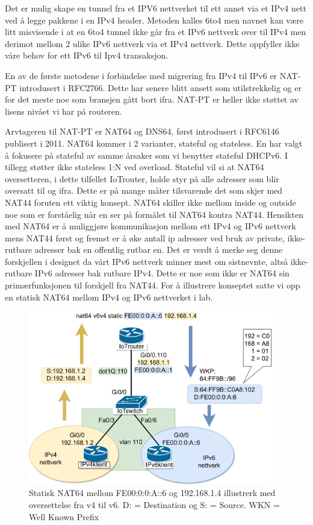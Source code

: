 \documentclass{article}
\begin{document}
Det er mulig skape en tunnel fra et IPV6 nettverket til ett annet via et IPv4 nett ved å legge pakkene i en IPv4 header. Metoden kalles 6to4\cite{rfc3056} men navnet kan være litt misvisende i at en 6to4 tunnel ikke går fra et IPv6 nettverk over til IPv4 men derimot mellom 2 ulike IPv6 nettverk via et IPv4 nettverk. Dette oppfyller ikke våre behov for ett IPv6 til Ipv4 transaksjon. 

En av de første metodene i forbindelse med migrering fra IPv4 til IPv6 er NAT-PT introdusert i RFC2766\cite{rfc2766}. Dette har senere blitt ansett som utilstrekkelig\cite{rfc4966} og er for det meste noe som bransjen gått bort ifra. NAT-PT er heller ikke støttet av lisens nivået vi har på routeren. 

Arvtageren til NAT-PT er NAT64 og DNS64, først introdusert i  RFC6146 publisert i 2011\cite{rfc6146}. NAT64 kommer i 2 varianter, stateful og stateless. En har valgt å fokusere på stateful av samme årsaker som vi benytter stateful DHCPv6. I tillegg støtter ikke stateless 1:N ved overload. Stateful vil si at NAT64 oversetteren, i dette tilfellet IoTrouter, holde styr på alle adresser som blir oversatt til og ifra. Dette er på mange måter tilsvarende det som skjer med NAT44 foruten ett viktig konsept. NAT64 skiller ikke mellom inside og outside noe som er forståelig når en ser på formålet til NAT64 kontra NAT44. Hensikten med NAT64 er å muliggjøre kommunikasjon mellom ett IPv4 og IPv6 nettverk mens NAT44 først og fremst er å øke antall ip adresser ved bruk av private, ikke-rutbare adresser bak en offentlig rutbar en. Det er verdt å merke seg denne forskjellen i designet da vårt IPv6 nettverk minner mest om sistnevnte, altså ikke-rutbare IPv6 adresser bak rutbare IPv4. Dette er noe som ikke er NAT64 sin primærfunksjonen til forskjell fra NAT44\cite{rfc1631}. For å illustrere konseptet satte vi opp en statisk NAT64 mellom IPv4 og IPv6 nettverket i lab.

\begin{figure} [!ht]
  \centering
      \includegraphics[width=0.95\textwidth]{statisknat64}
  \caption{Statisk NAT64 mellom FE00:0:0:A::6 og 192.168.1.4 illustrerk med oversettelse fra v4 til v6. D: = Destination og S: = Source. WKN = Well Known Prefix}
\end{figure} 
\end{document}
